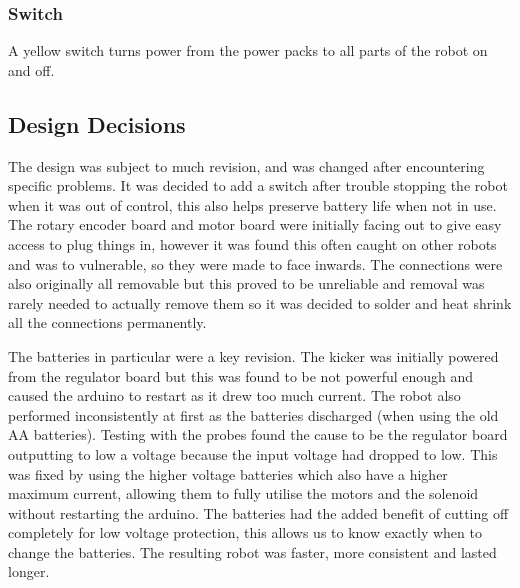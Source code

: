\subsubsection{Switch}
A yellow switch turns power from the power packs to all parts of the robot on and off.

\subsection{Design Decisions}
The design was subject to much revision, and was changed after encountering specific problems. It was decided to add a switch after trouble stopping the robot when it was out of control, this also helps preserve battery life when not in use. The rotary encoder board and motor board were initially facing out to give easy access to plug things in, however it was found this often caught on other robots and was to vulnerable, so they were made to face inwards. The connections were also originally all removable but this proved to be unreliable and removal was rarely needed to actually remove them so it was decided to solder and heat shrink all the connections permanently.

The batteries in particular were a key revision. The kicker was initially powered from the regulator board but this was found to be not powerful enough and caused the arduino to restart as it drew too much current. The robot also performed inconsistently at first as the batteries discharged (when using the old AA batteries). Testing with the probes found the cause to be the regulator board outputting to low a voltage because the input voltage had dropped to low. This was fixed by using the higher voltage batteries which also have a higher maximum current, allowing them to fully utilise the motors and the solenoid without restarting the arduino. The batteries had the added benefit of cutting off completely for low voltage protection, this allows us to know exactly when to change the batteries. The resulting robot was faster, more consistent and lasted longer. 
